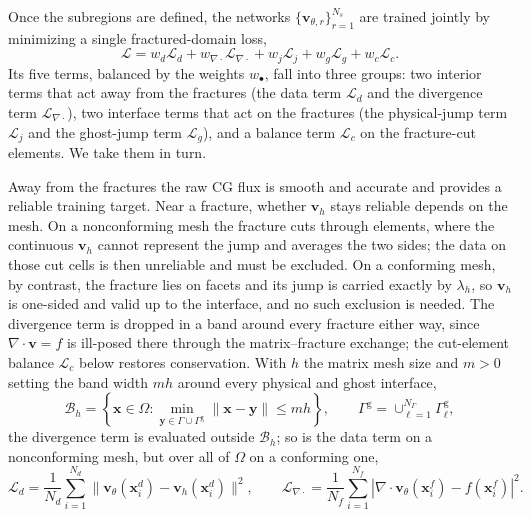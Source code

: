 \documentclass[a4paper,fleqn]{cas-sc}
\newcommand{\vflux}{\mathbf{v}}
\begin{document}
Once the subregions are defined, the networks
\(\{\vflux_{\theta,r}\}_{r=1}^{N_s}\) are trained jointly by minimizing a single
fractured-domain loss,
\begin{equation}
\mathcal{L}
=
w_d\mathcal{L}_d
+
w_{\nabla\cdot}\mathcal{L}_{\nabla\cdot}
+
w_j\mathcal{L}_j
+
w_g\mathcal{L}_g
+
w_c\mathcal{L}_c .
\label{eq:pinn_fractured_loss}
\end{equation}
Its five terms, balanced by the weights \(w_\bullet\), fall into three groups:
two interior terms that act away from the fractures (the data term
\(\mathcal{L}_d\) and the divergence term \(\mathcal{L}_{\nabla\cdot}\)), two
interface terms that act on the fractures (the physical-jump term
\(\mathcal{L}_j\) and the ghost-jump term \(\mathcal{L}_g\)), and a balance term
\(\mathcal{L}_c\) on the fracture-cut elements. We take them in turn.

Away from the fractures the raw CG flux is smooth and accurate and provides a
reliable training target. Near a fracture, whether \(\vflux_h\) stays reliable depends on the
mesh. On a nonconforming mesh the fracture cuts through elements, where the
continuous \(\vflux_h\) cannot represent the jump and averages the two sides; the
data on those cut cells is then unreliable and must be excluded. On a conforming
mesh, by contrast, the fracture lies on facets and its jump is carried exactly by
\(\lambda_h\), so \(\vflux_h\) is one-sided and valid up to the interface, and no
such exclusion is needed. The divergence
term is dropped in a band around every fracture either way, since
\(\nabla\cdot\vflux=f\) is ill-posed there through the matrix--fracture exchange;
the cut-element balance \(\mathcal{L}_c\) below restores conservation. With \(h\) the matrix
mesh size and
\(m>0\) setting the band width \(mh\) around every physical and ghost interface,
\[
  \mathcal{B}_h
  =
  \left\{\mathbf{x}\in\Omega:
  \min_{\mathbf{y}\in\Gamma\cup\Gamma^{\mathrm{g}}}\|\mathbf{x}-\mathbf{y}\|\le mh
  \right\},
  \qquad
  \Gamma^{\mathrm{g}}=\cup_{\ell=1}^{N_\Gamma}
  \Gamma_\ell^{\mathrm{g}} ,
\]
the divergence term is evaluated outside \(\mathcal{B}_h\); so is
the data term on a nonconforming mesh, but over all of \(\Omega\) on a conforming
one,
\begin{equation}
\mathcal{L}_d
=
\frac{1}{N_d}\sum_{i=1}^{N_d}
\|\vflux_\theta(\mathbf{x}_i^d)-\vflux_h(\mathbf{x}_i^d)\|^2,
\qquad
\mathcal{L}_{\nabla\cdot}
=
\frac{1}{N_f}\sum_{i=1}^{N_f}
\left|\nabla\cdot\vflux_\theta(\mathbf{x}_i^f)-f(\mathbf{x}_i^f)\right|^2 .
\label{eq:pinn_data_div_loss}
\end{equation}
\end{document}
